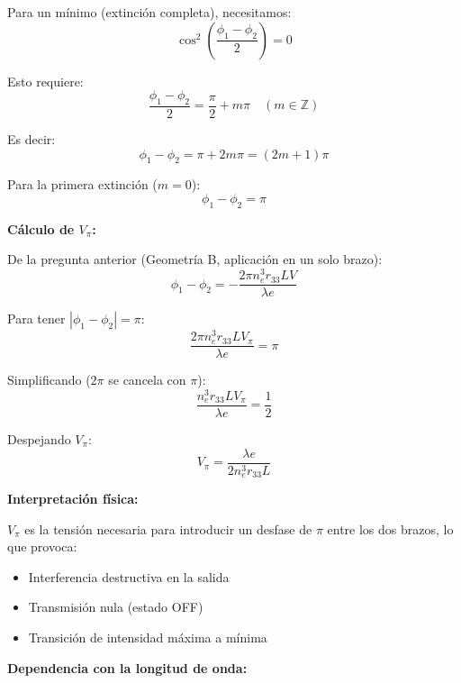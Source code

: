 \documentclass[12pt,a4paper]{article}
\begin{document}
\begin{enumerate}
Para un mínimo (extinción completa), necesitamos:
\begin{equation}
    \cos^2\left(\frac{\phi_1 - \phi_2}{2}\right) = 0
\end{equation}

Esto requiere:
\begin{equation}
    \frac{\phi_1 - \phi_2}{2} = \frac{\pi}{2} + m\pi \quad (m \in \mathbb{Z})
\end{equation}

Es decir:
\begin{equation}
    \phi_1 - \phi_2 = \pi + 2m\pi = (2m+1)\pi
\end{equation}

Para la primera extinción ($m=0$):
\begin{equation}
    \phi_1 - \phi_2 = \pi
\end{equation}

\textbf{Cálculo de $V_\pi$:}

De la pregunta anterior (Geometría B, aplicación en un solo brazo):
\begin{equation}
    \phi_1 - \phi_2 = -\frac{2\pi n_e^3 r_{33} L V}{\lambda e}
\end{equation}

Para tener $|\phi_1 - \phi_2| = \pi$:
\begin{equation}
    \frac{2\pi n_e^3 r_{33} L V_\pi}{\lambda e} = \pi
\end{equation}

Simplificando ($2\pi$ se cancela con $\pi$):
\begin{equation}
    \frac{n_e^3 r_{33} L V_\pi}{\lambda e} = \frac{1}{2}
\end{equation}

Despejando $V_\pi$:
\begin{equation}
    \boxed{V_\pi = \frac{\lambda e}{2 n_e^3 r_{33} L}}
\end{equation}

\textbf{Interpretación física:}

$V_\pi$ es la tensión necesaria para introducir un desfase de $\pi$ entre los dos brazos, lo que provoca:
\begin{itemize}
    \item Interferencia destructiva en la salida
    \item Transmisión nula (estado OFF)
    \item Transición de intensidad máxima a mínima
\end{itemize}

\textbf{Dependencia con la longitud de onda:}


\end{enumerate}
\end{document}
